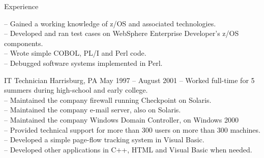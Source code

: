 \documentclass[letterpaper, 11pt]{article}
\begin{document}
\begin{resume}
\begin{category}{Experience}
\begin{block}
                -- Gained a working knowledge of z/OS and associated technologies.                      \\
                -- Developed and ran test cases on WebSphere Enterprise Developer's z/OS components.    \\
                -- Wrote simple COBOL, PL/I and Perl code.                                              \\
                -- Debugged software systems implemented in Perl.
            \end{block}
            \begin{block}
                 {IT Technician}
                         {Harrisburg, PA}            {May 1997 -- August 2001}
                -- Worked full-time for 5 summers during high-school and early college.             \\
                -- Maintained the company firewall running Checkpoint on Solaris.                   \\
                -- Maintained the company e-mail server, also on Solaris.                           \\
                -- Maintained the company Windows Domain Controller, on Windows 2000                \\
                -- Provided technical support for more than 300 users on more than 300 machines.    \\
                -- Developed a simple page-flow tracking system in Visual Basic.                    \\
                -- Developed other applications in C++, HTML and Visual Basic when needed.
            \end{block}
        \end{category}
    \end{resume}
\end{document}
